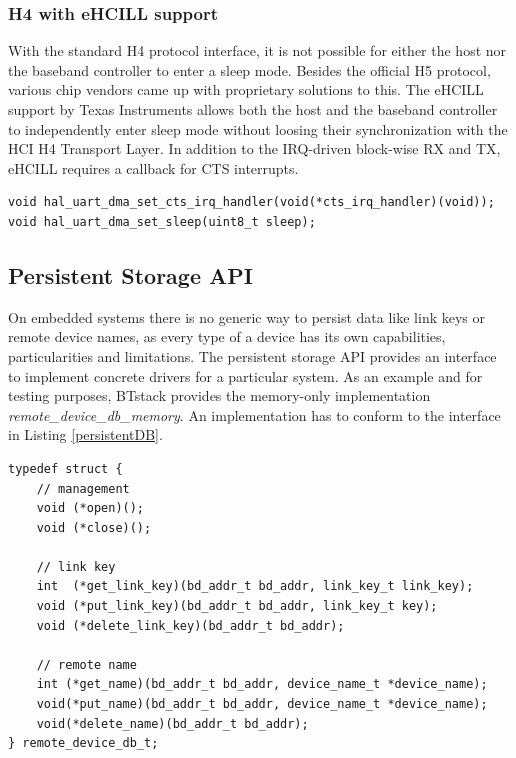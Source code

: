 \documentclass[a4paper,titlepage,oneside,12pt]{amsart} %
\begin{document}
\subsubsection{H4 with eHCILL support}
With the standard H4 protocol interface, it is not possible for either the host nor the baseband controller to enter a sleep mode. Besides the official H5 protocol, various chip vendors came up with proprietary solutions to this. The eHCILL support by Texas Instruments allows both the host and the baseband controller to independently enter sleep mode without loosing their synchronization with the HCI H4 Transport Layer. In addition to the IRQ-driven block-wise RX and TX, eHCILL requires a callback for CTS interrupts.

\begin{lstlisting}
void hal_uart_dma_set_cts_irq_handler(void(*cts_irq_handler)(void));
void hal_uart_dma_set_sleep(uint8_t sleep);
\end{lstlisting}


\subsection{Persistent Storage API}
\label{section:persistent_storage}

On embedded systems there is no generic way to persist data like link keys or remote device names, as every type of a device has its own capabilities, particularities and limitations. The persistent storage API provides an interface to implement concrete drivers for a particular system. As an example and for testing purposes, BTstack provides the memory-only implementation \emph{remote\_device\_db\_memory}. An implementation has to conform to the interface in Listing \ref{persistentDB}.
\\

\begin{lstlisting}[caption=Persistent Storage Interface., label=persistentDB]
typedef struct {
    // management
    void (*open)();
    void (*close)();
    
    // link key
    int  (*get_link_key)(bd_addr_t bd_addr, link_key_t link_key);
    void (*put_link_key)(bd_addr_t bd_addr, link_key_t key);
    void (*delete_link_key)(bd_addr_t bd_addr);
    
    // remote name
    int (*get_name)(bd_addr_t bd_addr, device_name_t *device_name);
    void(*put_name)(bd_addr_t bd_addr, device_name_t *device_name);
    void(*delete_name)(bd_addr_t bd_addr);
} remote_device_db_t;

\end{lstlisting}
\end{document}
